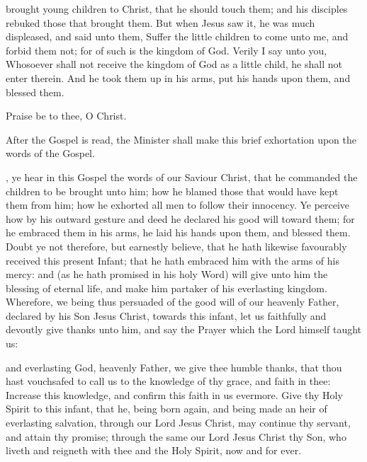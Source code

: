  brought young children to Christ, that he should touch them; and his disciples rebuked those that brought them.
But when Jesus saw it, he was much displeased, and said unto them, Suffer the little children to come unto me, and forbid them not; for of such is the kingdom of God.
Verily I say unto you, Whosoever shall not receive the kingdom of God as a little child, he shall not enter therein.
And he took them up in his arms, put his hands upon them, and blessed them.

\begin{leftbar}
 Praise be to thee, O Christ.
\end{leftbar}

\begin{rubric}
After the Gospel is read, the Minister shall make this brief exhortation upon the words of the Gospel.
\end{rubric}

, ye hear in this Gospel the words of our Saviour Christ, that he commanded the children to be brought unto him; how he blamed those that would have kept them from him; how he exhorted all men to follow their innocency.
Ye perceive how by his outward gesture and deed he declared his good will toward them; for he embraced them in his arms, he laid his hands upon them, and blessed them.
Doubt ye not therefore, but earnestly believe, that he hath likewise favourably received this present Infant; that he hath embraced him with the arms of his mercy: and (as he hath promised in his holy Word) will give unto him the blessing of eternal life, and make him partaker of his everlasting kingdom.
Wherefore, we being thus persuaded of the good will of our heavenly Father, declared by his Son Jesus Christ, towards this infant, let us faithfully and devoutly give thanks unto him, and say the Prayer which the Lord himself taught us:



\newpage

 and everlasting God, heavenly Father, we give thee humble thanks, that thou hast vouchsafed to call us to the knowledge of thy grace, and faith in thee: Increase this knowledge, and confirm this faith in us evermore.
Give thy Holy Spirit to this infant, that he, being born again, and being made an heir of everlasting salvation, through our Lord Jesus Christ, may continue thy servant, and attain thy promise; through the same our Lord Jesus Christ thy Son, who liveth and reigneth with thee and the Holy Spirit, now and for ever.

